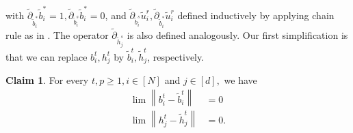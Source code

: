 \documentclass{article}
\newcommand{\1}{\mathbbm{1}}
\newcommand{\norm}[1]{\left\lVert#1\right\rVert}
\theoremstyle{plain}
\theoremstyle{definition}
\newtheorem{claim}[theorem]{Claim}
\theoremstyle{remark}
\begin{document}
with $\tilde{\partial}_{\tilde{b}_i^*}\tilde{b}_i^* = 1, \tilde{\partial}_{\tilde{b}_i^s}\tilde{b}_i^* = 0$, and $\tilde{\partial}_{\tilde{b}_i^s} \tilde{u}_i^r,\tilde{\partial}_{\tilde{b}_i^*} \tilde{u}_i^r$ defined inductively by applying chain rule as in . The operator $\tilde{\partial}_{\tilde{h}_j^s}$ is also defined analogously. Our first simplification is that we can replace ${b}_i^t,{h}_j^t$  by $\tilde{b}_i^t,\tilde{h}_j^t$, respectively.
\begin{claim}\label{claim:recursive-claim-1}
    For every $t,p\geq 1,i\in [N]$ and $j\in [d],$ we have 
    \begin{align*}
        \lim \norm{b_i^t - \tilde{b}_i^t} &= 0 \\
        \lim \norm{h_j^t - \tilde{h}_j^t} &= 0.
    \end{align*}
\end{claim}
\end{document}
